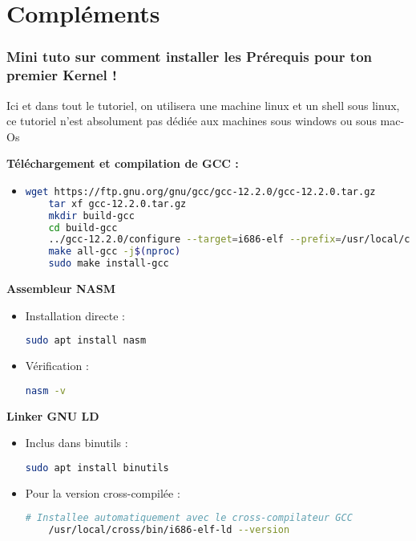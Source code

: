 \documentclass{article}
\begin{document}
\section*{Compléments}
\subsubsection*{Mini tuto sur comment installer les Prérequis pour ton premier Kernel !}
\begin{figure}[h]
    \label{fig:tutoinstalltt}
\end{figure}
Ici et dans tout le tutoriel, on utilisera une machine linux et un shell sous linux, ce tutoriel n'est absolument pas dédiée aux machines sous windows ou sous mac-Os

\textbf{Téléchargement et compilation de GCC :}
\begin{itemize}
    \item 
    \begin{lstlisting}[language=bash]
    wget https://ftp.gnu.org/gnu/gcc/gcc-12.2.0/gcc-12.2.0.tar.gz
    tar xf gcc-12.2.0.tar.gz
    mkdir build-gcc
    cd build-gcc
    ../gcc-12.2.0/configure --target=i686-elf --prefix=/usr/local/cross --disable-nls --enable-languages=c,c++ --without-headers
    make all-gcc -j$(nproc)
    sudo make install-gcc
    \end{lstlisting}
    \end{itemize}

\textbf{Assembleur NASM}
\begin{itemize}
    \item Installation directe :
    \begin{lstlisting}[language=bash]
    sudo apt install nasm
    \end{lstlisting}
    
    \item Vérification :
    \begin{lstlisting}[language=bash]
    nasm -v
    \end{lstlisting}
\end{itemize}

\textbf{Linker GNU LD}
\begin{itemize}
    \item Inclus dans binutils :
    \begin{lstlisting}[language=bash]
    sudo apt install binutils
    \end{lstlisting}
    
    \item Pour la version cross-compilée :
    \begin{lstlisting}[language=bash]
    # Installee automatiquement avec le cross-compilateur GCC
    /usr/local/cross/bin/i686-elf-ld --version
    \end{lstlisting}
\end{itemize}
\end{document}
